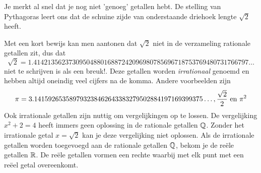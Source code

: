 \documentclass{ximera}
\begin{document}
Je merkt al snel dat je nog niet 'genoeg' getallen hebt. 
De stelling van Pythagoras 
leert ons dat de schuine zijde van onderstaande driehoek lengte \( \sqrt{2}\) heeft. 


\begin{image}[3cm]
    
\end{image}
    
Met een kort bewijs kan men aantonen dat \(\sqrt{2}\) niet in de verzameling rationale getallen zit, dus dat 
\[\sqrt{2} = 1.4142135623730950488016887242096980785696718753769480731766797\ldots%
\]  
niet te schrijven is als een breuk!. 
Deze getallen worden \textit{irrationaal} genoemd en hebben altijd oneindig veel cijfers na de komma.
%
Andere voorbeelden zijn 
\[ \pi = 3.141592653589793238462643383279502884197169399375\ldots%
,
\frac{\sqrt{2}}{2}
\Ten \pi^2 
\]
%
Ook irrationale getallen zijn nuttig om vergelijkingen op te lossen. 
De vergelijking \(x^2 + 2 = 4\) heeft immers geen oplossing in de rationale getallen \( \mathbb{Q} \).
Zonder het irrationale getal \(x = \sqrt{2} \) kan je deze vergelijking niet oplossen.
Als de irrationale getallen worden toegevoegd aan de rationale getallen \(\mathbb{Q}\), bekom je de reële getallen \(\mathbb{R}\). 
De reële getallen vormen een rechte waarbij met elk punt met een reëel getal overeenkomt. 
\end{document}
